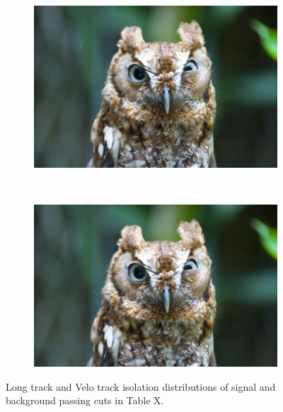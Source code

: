 \begin{figure}
    \centering
    \begin{subfigure}[b]{0.4\textwidth}
        \includegraphics[width=\textwidth]{./Figs/placeholder.jpeg}
        \caption{ }
        \label{fig:long}
    \end{subfigure}
    ~ %
    \begin{subfigure}[b]{0.4\textwidth}
       \includegraphics[width=\textwidth]{./Figs/placeholder.jpeg}
        \caption{ }
        \label{fig:velo}
    \end{subfigure}
    \caption{Long track and Velo track isolation distributions of signal and background passing cuts in Table X.}
    \label{fig:Isolations}
\end{figure}

